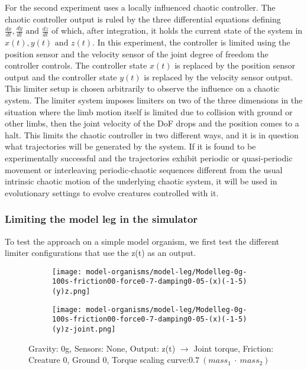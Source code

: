 \documentclass[main]{subfiles}
\begin{document}
For the second experiment uses a locally influenced chaotic controller. The chaotic controller output is ruled by the three differential equations defining \(\frac{dx}{dt},\frac{dy}{dt} \text{ and } \frac{dz}{dt}\) of which, after integration, it holds the current state of the system in \(x(t),y(t) \text{ and } z(t)\).  In this experiment, the controller is limited using the position sensor and the velocity sensor of the joint degree of freedom the controller controls. The controller state \(x(t)\) is replaced by the position sensor output and the controller state \(y(t)\) is replaced by the velocity sensor output. This limiter setup is chosen arbitrarily to observe the influence on a chaotic system. The limiter system imposes limiters on two of the three dimensions in the situation where the limb motion itself is limited due to collision with ground or other limbs, then the joint velocity of the DoF drops and the position comes to a halt. This limits the chaotic controller in two different ways, and it is in question what trajectories will be generated by the system. If it is found to be experimentally successful and the trajectories exhibit periodic or quasi-periodic movement or interleaving periodic-chaotic sequences different from the usual intrinsic chaotic motion of the underlying chaotic system, it will be used in evolutionary settings to evolve creatures controlled with it.

\subsubsection{Limiting the model leg in the simulator}

To test the approach on a simple model organism, we first test the different limiter configurations that use the z(t) as an output.

\begin{figure}[H]
	\centering
	\begin{subfigure}[c]{0.45\textwidth}
	\texttt{[image: model-organisms/model-leg/Modelleg-0g-100s-friction00-force0-7-damping0-05-(x)(-1-5)(y)z.png]}
	\end{subfigure}
	\begin{subfigure}[c]{0.45\textwidth}
	\texttt{[image: model-organisms/model-leg/Modelleg-0g-100s-friction00-force0-7-damping0-05-(x)(-1-5)(y)z-joint.png]}
	\end{subfigure}
	\caption[Figure of chaotic behaviors in range 2.4-3.19]{Gravity: 0g, Sensors: None, Output: z(t) \(\rightarrow\) Joint torque, Friction: Creature 0, Ground 0, Torque scaling curve:\(0.7~(mass_1~\cdot~mass_2)\)}

	\label{figure:z-2.4-3.19-chaotictrajectories}
\end{figure}
\end{document}
